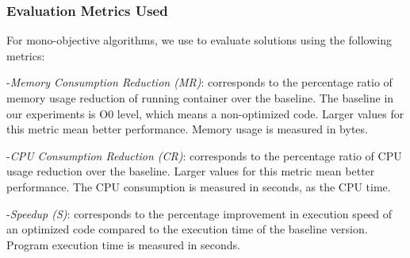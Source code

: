 \subsubsection{Evaluation Metrics Used}

For mono-objective algorithms, we use to evaluate solutions using the following metrics:

-\textit{Memory Consumption Reduction (MR)}: corresponds to the percentage ratio of memory usage reduction of running container over the baseline. The baseline in our experiments is O0 level, which means a non-optimized code. Larger values for this metric mean better performance. Memory usage is measured in bytes.

-\textit{CPU Consumption Reduction (CR)}: corresponds to the percentage ratio of CPU usage reduction over the baseline. Larger values for this metric mean better performance. The CPU consumption is measured in seconds, as the CPU time.

-\textit{Speedup (S)}: corresponds to the percentage improvement in execution speed of an optimized code compared to the execution time of the baseline version. Program execution time is measured in seconds.




